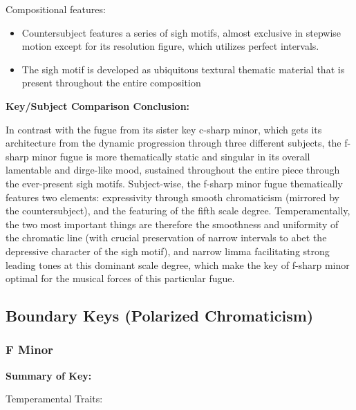 Compositional features:

\begin{itemize}
\tightlist
\item
  Countersubject features a series of sigh motifs, almost exclusive in
  stepwise motion except for its resolution figure, which utilizes
  perfect intervals.
\item
  The sigh motif is developed as ubiquitous textural thematic material
  that is present throughout the entire composition
\end{itemize}

\textbf{Key/Subject Comparison Conclusion:}

In contrast with the fugue from its sister key c-sharp minor, which gets
its architecture from the dynamic progression through three different
subjects, the f-sharp minor fugue is more thematically static and
singular in its overall lamentable and dirge-like mood, sustained
throughout the entire piece through the ever-present sigh motifs.
Subject-wise, the f-sharp minor fugue thematically features two
elements: expressivity through smooth chromaticism (mirrored by the
countersubject), and the featuring of the fifth scale degree.
Temperamentally, the two most important things are therefore the
smoothness and uniformity of the chromatic line (with crucial
preservation of narrow intervals to abet the depressive character of the
sigh motif), and narrow limma facilitating strong leading tones at this
dominant scale degree, which make the key of f-sharp minor optimal for
the musical forces of this particular fugue.

    \subsection{Boundary Keys (Polarized
Chromaticism)}\label{boundary-keys-polarized-chromaticism}

    \subsubsection{F Minor}\label{f-minor}

\textbf{Summary of Key:}


    \begin{center}
    \end{center}
    
    Temperamental Traits:

